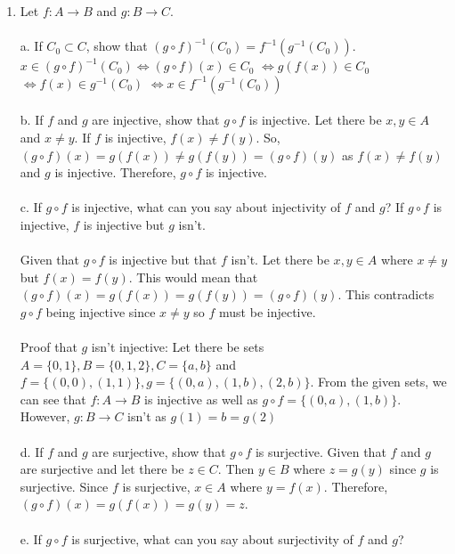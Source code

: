 \documentclass[]{article}
\begin{document}
\begin{enumerate}
    \item Let $f: A \rightarrow B$ and $g: B \rightarrow C$.
    \\\\a. If $C_0 \subset C$, show that $(g \circ f)^{-1}(C_0)=f^{-1}(g^{-1}(C_0))$.
    \newline $x \in (g \circ f)^{-1}(C_0) \iff (g \circ f)(x) \in C_0$
    \newline $\iff g(f(x)) \in C_0$
    \newline $\iff f(x) \in g^{-1}(C_0)$
    \newline $\iff x \in f^{-1}(g^{-1}(C_0))$
    \\\\b. If $f$ and $g$ are injective, show that $g \circ f$ is injective.
    \newline Let there be $x, y \in A$ and $x \neq y$. If $f$ is injective, $f(x) \neq f(y)$. So, $(g \circ f)(x)=g(f(x)) \neq g(f(y))=(g \circ f)(y)$ as $f(x) \neq f(y)$ and $g$ is injective. Therefore, $g \circ f$ is injective.
    \\\\c. If $g \circ f$ is injective, what can you say about injectivity of $f$ and $g$?
    \newline If $g \circ f$ is injective, $f$ is injective but $g$ isn't.
    \\\\ Given that $g \circ f$ is injective but that $f$ isn't. Let there be $x,y \in A$ where $x \neq y$ but $f(x)=f(y)$. This would mean that $(g \circ f)(x)=g(f(x))=g(f(y))=(g \circ f)(y)$. This contradicts $g \circ f$ being injective since $x \neq y$ so $f$ must be injective.
    \\\\ Proof that $g$ isn't injective:
    \newline Let there be sets $A=\{0,1\},B=\{0,1,2\},C=\{a,b\}$ and $f=\{(0,0),(1,1)\},g=\{(0,a),(1,b),(2,b)\}$. From the given sets, we can see that $f: A \rightarrow B$ is injective as well as $g \circ f=\{(0,a),(1,b)\}$. However, $g: B \rightarrow C$ isn't as $g(1)=b=g(2)$
    \\\\d. If $f$ and $g$ are surjective, show that $g \circ f$ is surjective.
    \newline Given that $f$ and $g$ are surjective and let there be $z \in C$. Then $y \in B$ where $z=g(y)$ since $g$ is surjective. Since $f$ is surjective, $x \in A$ where $y=f(x)$. Therefore, $(g \circ f)(x)=g(f(x))=g(y)=z$.
    \\\\e. If $g \circ f$ is surjective, what can you say about surjectivity of $f$ and $g$?

\end{enumerate}
\end{document}
